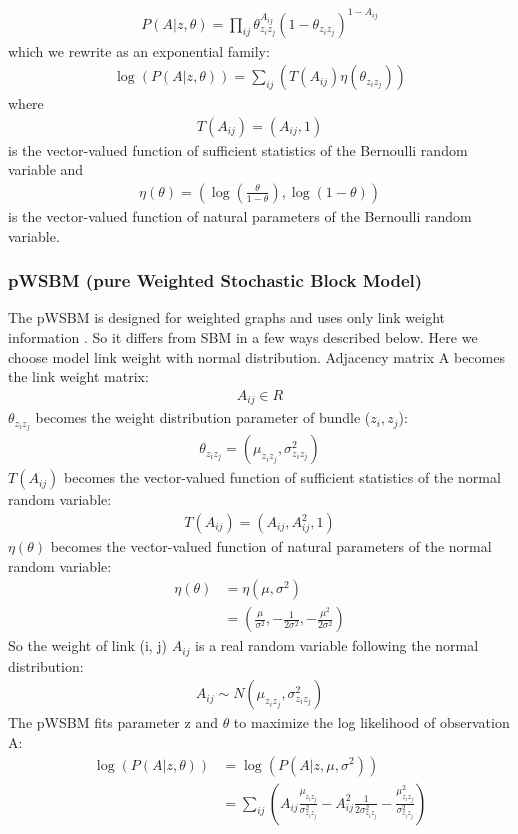 \documentclass{article}
\begin{document}
\begin{align*}
	P(A|z, \theta) 
	= \prod_{ij} \theta_{z_i z_j}^{A_{ij}}(1-\theta_{z_i z_j})^{1-A_{ij}}
\end{align*}
which we rewrite as an exponential family:
\begin{align*}
\log(P(A|z, \theta))
= \sum_{ij} (
T(A_{ij}) \eta(\theta_{z_i z_j})
)
\end{align*}
where
\begin{align*}
T(A_{ij}) = (A_{ij}, 1)
\end{align*}
is the vector-valued function of sufficient statistics of the Bernoulli random variable and
\begin{align*}
\eta(\theta) = ( \log(\frac{\theta}{1-\theta}), \log(1-\theta) )
\end{align*}
is the vector-valued function of natural parameters of the Bernoulli random variable.

\subsubsection{pWSBM (pure Weighted Stochastic Block Model)}
The pWSBM is designed for weighted graphs and uses only link weight information \cite{aicher2014learning}.
So it differs from SBM in a few ways described below.
Here we choose model link weight with normal distribution.
Adjacency matrix A becomes the link weight matrix:
\begin{align*}
A_{ij} \in R
\end{align*}
$ \theta_{z_i z_j} $ becomes the weight distribution parameter of bundle ($z_i, z_j$):
\begin{align*}
\theta_{z_i z_j} = (\mu_{z_i z_j}, \sigma_{z_i z_j}^2)
\end{align*}
$ T(A_{ij}) $ becomes the vector-valued function of sufficient statistics of the normal random variable:
\begin{align*}
T(A_{ij}) = (A_{ij}, A_{ij}^2, 1)
\end{align*}
$ \eta(\theta) $ becomes the vector-valued function of natural parameters of the normal random variable:
\begin{align*}
\eta(\theta)
&= \eta(\mu, \sigma^2)\\
&= (\frac{\mu}{\sigma^2}, -\frac{1}{2\sigma^2}, -\frac{\mu^2}{2\sigma^2})
\end{align*}
So the weight of link (i, j)  $ A_{ij} $ is a real random variable following the normal distribution:
\begin{align*}
A_{ij} \sim N(\mu_{z_i z_j}, \sigma_{z_i z_j}^2)
\end{align*}
The pWSBM fits parameter z and $ \theta $
to maximize the log likelihood of observation A:
\begin{align*}
\log(P(A|z, \theta))
&= \log(P(A|z, \mu, \sigma^2))\\
&= \sum_{ij} (
A_{ij} \frac{\mu_{z_i z_j}}{\sigma_{z_i z_j}^2}
- A_{ij}^2 \frac{1}{2\sigma_{z_i z_j}^2}
- \frac{\mu_{z_i z_j}^2}{\sigma_{z_i z_j}^2}
)
\end{align*}
\end{document}
